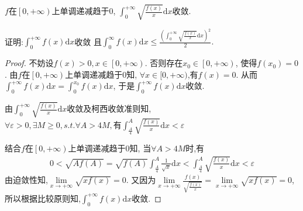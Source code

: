 \documentclass[../../main.tex]{subfiles}%
\begin{document}
\begin{example}
$f$在$\left[ 0,+\infty \right) $上单调递减趋于0,
$\int_0^{+\infty}{\sqrt{\frac{f(x)}{x}}\mathrm{d}x}$收敛.

证明:$\int_0^{+\infty}{f\left( x \right) \mathrm{d}x}$收敛
且$\int_0^{\infty}{f\left( x \right) \mathrm{d}x}\leqslant \frac{\left( \int_0^{+\infty}{\sqrt{\frac{f\left( x \right)}{x}}\mathrm{d}x} \right) ^2}{2}.$
\end{example}
\begin{proof}
不妨设$f(x)>0,x\in \left[ 0,+\infty \right)$.
否则存在$x_0\in \left[ 0,+\infty \right)$,
使得$f\left( x_0 \right) =0$.
由$f$在$\left[ 0,+\infty \right) $上单调递减趋于0知,
$ \forall x\in [0,+\infty)$,有$f(x)=0$.
从而$\int_0^{+\infty}{f\left( x \right) \mathrm{d}x}=\int_0^{x_0}{f\left( x \right) \mathrm{d}x}$,
于是$\int_0^{+\infty}{f\left( x \right) \mathrm{d}x}$收敛.

由$\int_0^{+\infty}{\sqrt{\frac{f(x)}{x}}\mathrm{d}x}$收敛及柯西收敛准则知,
$\forall \varepsilon>0,\exists M\geqslant 0,s.t. \forall A>4M,\text{有}
\int_{\frac{A}{4}}^A{\sqrt{\frac{f(x)}{x}}\mathrm{d}x}<\varepsilon$

结合$f$在$\left[ 0,+\infty \right) $上单调递减趋于0知,
当$\forall A>4M$时,有
\begin{equation}
\begin{split}
0<\sqrt{Af(A)}=\sqrt{f(A)}\int_{\frac{A}{4}}^A{\frac{1}{\sqrt{x}}\mathrm{d}x<}\int_{\frac{A}{4}}^A{\sqrt{\frac{f(x)}{x}}\mathrm{d}x<}\varepsilon 
\end{split}
\nonumber
\end{equation}
由迫敛性知,$\underset{x\rightarrow +\infty}{\lim}\sqrt{xf(x)}=0$.
又因为$\underset{x\rightarrow +\infty}{\lim}\frac{f(x)}{\sqrt{\frac{f(x)}{x}}}=\underset{x\rightarrow +\infty}{\lim}\sqrt{xf(x)}=0$,
所以根据比较原则知,$\int_0^{+\infty}{f\left( x \right) \mathrm{d}x}$收敛.


\end{proof}
\end{document}
